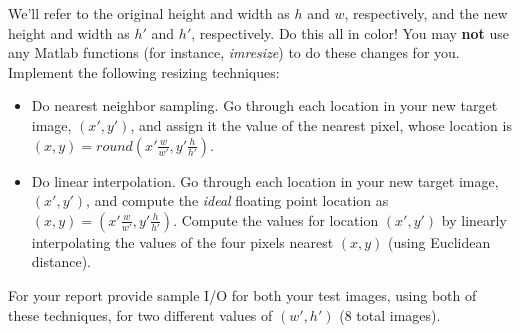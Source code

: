 \documentclass{article}
\begin{document}
\noindent
We'll refer to the original height and width as $h$ and $w$, respectively, and the new height and width as $h\prime$ and $h\prime$, respectively.  Do this all in color!  You may \textbf{not} use any Matlab functions (for instance, \emph{imresize}) to do these changes for you.\\   

\noindent
Implement the following resizing techniques:
\begin{itemize}
\item Do nearest neighbor sampling.   Go through each location in your new target image, $(x\prime, y\prime)$, and assign it the value of the nearest pixel, whose location is $(x, y) = round(x\prime \frac{w}{w\prime}, y\prime \frac{h}{h\prime})$.
\item Do linear interpolation.   Go through each location in your new target image, $(x\prime, y\prime)$, and compute the \emph{ideal} floating point location as $(x, y) =(x\prime \frac{w}{w\prime}, y\prime \frac{h}{h\prime})$.  Compute the values for location $(x\prime, y\prime)$ by linearly interpolating the values of the four pixels nearest $(x,y)$ (using Euclidean distance).
\end{itemize}

\noindent
For your report provide sample I/O for both your test images, using both of these techniques, for two different values of $(w\prime, h\prime)$ (8 total images).
\end{document}
